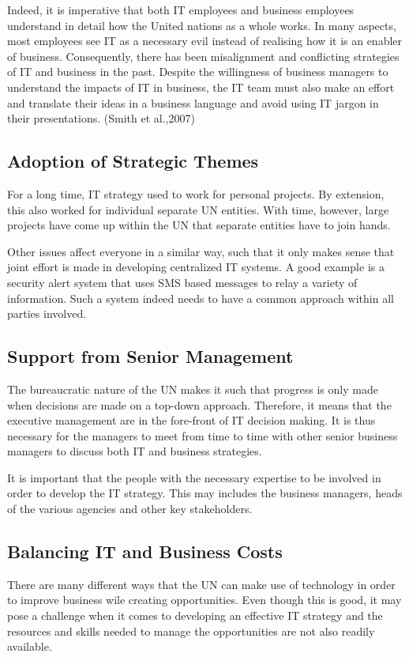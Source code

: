 \documentclass[12pt]{article}
\begin{document}
Indeed, it is imperative that both IT employees and business employees understand in detail how the United nations as a whole works. In many aspects, most employees see IT as a necessary evil instead of realising how it is an enabler of business. Consequently, there has been misalignment and conflicting strategies of IT and business in the past. Despite the willingness of business managers to understand the impacts of IT in business, the IT team must also make an effort and translate their ideas in a business language and avoid using IT jargon in their presentations. (Smith et al.,2007)

\subsection*{Adoption of Strategic Themes}
For a long time, IT strategy used to work for personal projects. By extension, this also worked for individual separate UN entities. With time, however, large projects have come up within the UN that separate entities have to join hands.

Other issues affect everyone in a similar way, such that it only makes sense that joint effort is made in developing centralized IT systems. A good example is a security alert system that uses SMS based messages to relay a variety of information. Such a system indeed needs to have a common approach within all parties involved.

\subsection*{Support from Senior Management}
The bureaucratic nature of the UN makes it such that progress is only made when decisions are made on a top-down approach. Therefore, it means that the executive management are in the fore-front of IT decision making. It is thus necessary for the managers to meet from time to time with other senior business managers to discuss both IT and business strategies.

It is important that the people with the necessary expertise to be involved in order to  develop the IT strategy. This may includes the business managers, heads of the various agencies and other key stakeholders.

\subsection*{Balancing IT and Business Costs}
There are many different ways that the UN can make use of technology in order to improve business wile creating opportunities. Even though this is good, it may pose a challenge when it comes to developing an effective IT strategy and the resources and skills needed to manage the opportunities are not also readily available.
\end{document}
